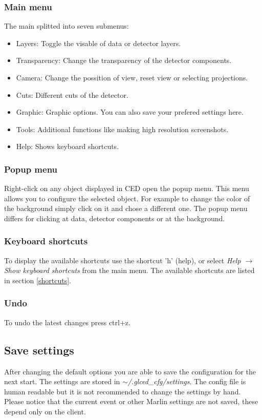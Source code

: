 \documentclass[a4paper,10pt]{article}
\begin{document}
\subsubsection{Main menu}
The main splitted into seven submenus: 
\begin{itemize}
    \item{Layers}: Toggle the visable of data or detector layers. 
    \item{Transparency}: Change the transparency of the detector components. 
    \item{Camera}: Change the possition of view, reset view or selecting projections. 
    \item{Cuts}: Different cuts of the detector. 
    \item{Graphic}: Graphic options. You can also save your prefered settings here.
    \item{Tools}: Additional functions like making high resolution screenshots.
    \item{Help}: Shows keyboard shortcuts.
\end{itemize}

\subsubsection{Popup menu}
Right-click on any object displayed in CED open the popup menu. 
This menu allows you to configure the selected object.
For example to change the color of the background simply click on it and chose a different one.
The popup menu differs for clicking at data, detector components or at the background.

\subsubsection{Keyboard shortcuts}
To display the available shortcuts use the shortcut 'h' (help), or select \textit{Help $\to$ Show keyboard shortcuts} from the main menu.
The available shortcuts are listed in section \ref{shortcuts}.

\subsubsection{Undo}
To undo the latest changes press ctrl+z.

\subsection{Save settings}
After changing the default options you are able to save the configuration for the next start. 
The settings are stored in \textit{$\sim$/.glced\_cfg/settings}.
The config file  is human readable but it is not recommended to change the settings by hand. 
Please notice that the current event or other Marlin settings are not saved, these depend only on the client. 
\end{document}
